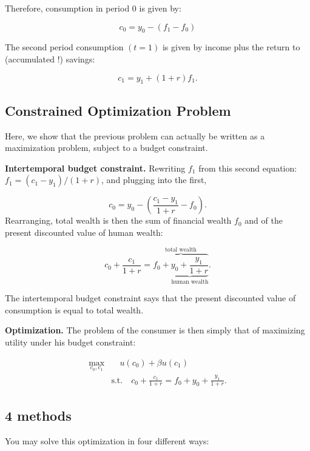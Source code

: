 \documentclass[]{book}
\theoremstyle{definition}
\theoremstyle{definition}
\theoremstyle{definition}
\theoremstyle{remark}
\begin{document}
Therefore, consumption in period \(0\) is given by:

\[c_{0} =y_{0}-(f_{1}-f_{0})\]

The second period consumption \((t=1)\) is given by income plus the
return to (accumulated !) savings:

\[c_{1} =y_{1}+(1+r)f_{1}.\]

\subsection{Constrained Optimization
Problem}\label{constrained-optimization-problem}

Here, we show that the previous problem can actually be written as a
maximization problem, subject to a budget constraint.

\textbf{Intertemporal budget constraint.} Rewriting \(f_{1}\) from this
second equation: \(f_{1}=(c_{1}-y_{1})/(1+r)\), and plugging into the
first,

\[c_{0}=y_{0}-\left(\frac{c_{1}-y_{1}}{1+r}-f_{0}\right).\] Rearranging,
total wealth is then the sum of financial wealth \(f_0\) and of the
present discounted value of human wealth:

\[c_{0}+\frac{c_{1}}{1+r}=\overbrace{f_{0}+\underbrace{y_{0}+\frac{y_{1}}{1+r}}_{\text{human wealth}}}^{\text{total wealth}}.\]

The intertemporal budget constraint says that the present discounted
value of consumption is equal to total wealth.

\textbf{Optimization.} The problem of the consumer is then simply that
of maximizing utility under his budget constraint:

\[
\begin{aligned} 
\max_{c_{0},c_{1}} & \quad u(c_{0})+\beta u(c_{1}) \\
& \text{s.t.} \quad c_{0}+\frac{c_{1}}{1+r}=f_{0}+y_{0}+\frac{y_{1}}{1+r}.
\end{aligned}
\]

\subsection{4 methods}\label{methods}

You may solve this optimization in four different ways:
\end{document}
